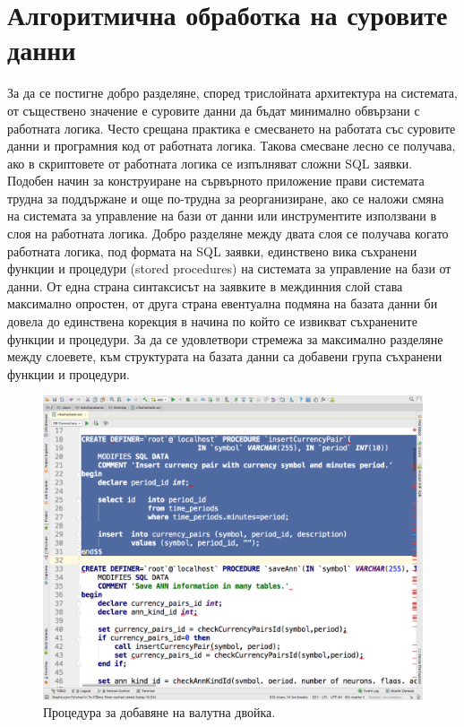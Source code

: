 \documentclass[book,14pt,oneside,openany]{memoir}
\begin{document}
\section{Алгоритмична обработка на суровите данни}

За да се постигне добро разделяне, според трислойната архитектура на системата, от съществено значение е суровите данни да бъдат минимално обвързани с работната логика. Често срещана практика е смесването на работата със суровите данни и програмния код от работната логика. Такова смесване лесно се получава, ако в скриптовете от работната логика се изпълняват сложни SQL заявки. Подобен начин за конструиране на сървърното приложение прави системата трудна за поддържане и още по-трудна за реорганизиране, ако се наложи смяна на системата за управление на бази от данни или инструментите използвани в слоя на работната логика. Добро разделяне между двата слоя се получава когато работната логика, под формата на SQL заявки, единствено вика съхранени функции и процедури (stored procedures) на системата за управление на бази от данни. От една страна синтаксисът на заявките в междинния слой става максимално опростен, от друга страна евентуална подмяна на базата данни би довела до единствена корекция в начина по който се извикват съхранените функции и процедури. За да се удовлетвори стремежа за максимално разделяне между слоевете, към структурата на базата данни са добавени група съхранени функции и процедури. 

\begin{figure}[h]
  \centering
  \includegraphics[height=0.45\pdfpageheight]{pic0104}
  \caption{Процедура за добавяне на валутна двойка.}
\label{fig:pic0104}
\end{figure}
\FloatBarrier
\end{document}
